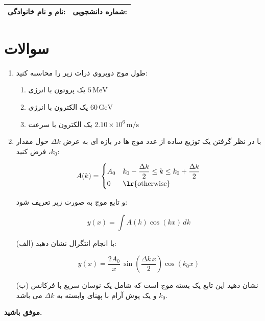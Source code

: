 \documentclass[12pt,a4paper]{article}
\begin{document}
	
	\begin{tabular}{|p{7cm}|p{7cm}|}
		\hline
		\textbf{نام و نام خانوادگی:} & \textbf{شماره دانشجویی:} \\
		\hline
	\end{tabular}
	
	\vspace{10pt}
	
	\section*{سوالات}
	
	\begin{enumerate}
		
		\item 
		
	
	
	طول موج دوبروي ذرات زير را محاسبه کنيد:
		
	\begin{enumerate}
		\item[(الف)] یک پروتون با انرژی \(5\,\mathrm{MeV}\)
		\item[(ب)] یک الکترون با انرژی \(60\,\mathrm{GeV}\)
		\item[(ج)] یک الکترون با سرعت \(2.10 \times 10^6\,\mathrm{m/s}\)
	\end{enumerate}
		
		\item
		
		
		با در نظر گرفتن یک توزیع ساده از عدد موج ها در بازه ای به عرض \(\Delta k\) حول مقدار \(k_0\)، فرض کنید:
		
		\[
		A(k) =
		\begin{cases}
			A_0 & k_0 - \dfrac{\Delta k}{2} \le k \le k_0 + \dfrac{\Delta k}{2} \\
			0 & \text{\lr{otherwise}}
		\end{cases}
		\]
		
		و تابع موج به صورت زیر تعریف شود:
		
		\[
		y(x) = \int A(k)\cos(kx)\,dk
		\]
		
		(الف) با انجام انتگرال نشان دهید:
		
		\[
		y(x) = \frac{2A_0}{x}\,\sin\left(\frac{\Delta k\, x}{2}\right)\cos(k_0 x)
		\]
		
		(ب) نشان دهید این تابع یک بسته موج  است که شامل یک نوسان سریع با فرکانس \(k_0\) و یک پوش آرام با پهنای وابسته به \(\Delta k\) می باشد.
		
	\end{enumerate}
	
	\vspace{10pt}
	\textbf{موفق باشید.}
	
\end{document}
